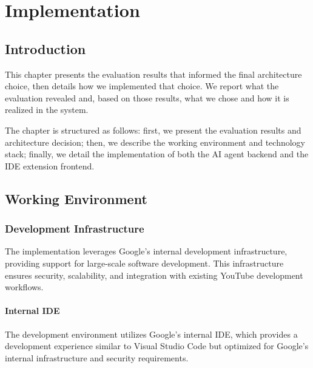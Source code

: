 \setcounter{chapter}{3}
\chapter{Implementation}
\minitoc %
\graphicspath{{Chapitre4/figures/}}

\pagestyle{fancy}
\fancyhf{}
\fancyhead[R]{\bfseries\rightmark}
\fancyfoot[R]{\thepage}
\renewcommand{\headrulewidth}{0.5pt}
\renewcommand{\footrulewidth}{0pt}
\renewcommand{\chaptermark}[1]{\markboth{{\chaptername~\thechapter. #1 }}{}}
\renewcommand{\sectionmark}[1]{\markright{\thechapter.\thesection~ #1}}

\begin{spacing}{1.2}

\section*{Introduction}
This chapter presents the evaluation results that informed the final architecture choice, then details how we implemented that choice. We report what the evaluation revealed and, based on those results, what we chose and how it is realized in the system.

The chapter is structured as follows: first, we present the evaluation results and architecture decision; then, we describe the working environment and technology stack; finally, we detail the implementation of both the AI agent backend and the IDE extension frontend.

\section{Working Environment}

\subsection{Development Infrastructure}
The implementation leverages Google's internal development infrastructure, providing support for large-scale software development. This infrastructure ensures security, scalability, and integration with existing YouTube development workflows.

\subsubsection{Internal IDE}
The development environment utilizes Google's internal IDE, which provides a development experience similar to Visual Studio Code but optimized for Google's internal infrastructure and security requirements.


\end{spacing}
